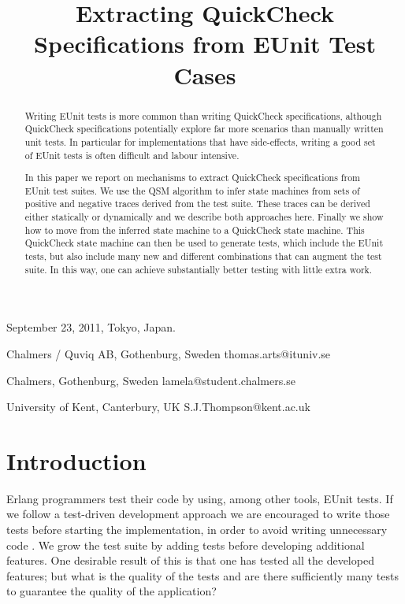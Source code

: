 \documentclass[]{sigplanconf}
\begin{document}
 {September 23, 2011, Tokyo, Japan.}

\title{Extracting QuickCheck Specifications from EUnit Test Cases}

                {Chalmers / Quviq AB, Gothenburg, Sweden}
                {thomas.arts@ituniv.se}

                {Chalmers, Gothenburg, Sweden}
                {lamela@student.chalmers.se}

                {University of Kent, Canterbury, UK}
                {S.J.Thompson@kent.ac.uk}



\maketitle

\begin{abstract}
Writing EUnit tests is more common than writing QuickCheck specifications, although QuickCheck specifications potentially explore far more scenarios than manually written unit tests. 
In particular for implementations that have side-effects, writing a good set of EUnit tests is often difficult and labour intensive.

In this paper we report on mechanisms to extract QuickCheck specifications from EUnit test suites. We use the QSM algorithm to infer state machines from sets of positive and negative traces derived from the test suite. These traces can be derived either statically or dynamically and we describe both approaches here. Finally we show how to move from the inferred state machine to a QuickCheck state machine. This QuickCheck state machine can then be used to generate tests, which include the EUnit tests, but also include many new and different combinations that can augment the test suite. In this way, one can achieve substantially better testing with little extra work.
\end{abstract}

\section{Introduction}

Erlang programmers test their code by using, among other tools,
EUnit tests. If we follow a test-driven development approach we are
encouraged to write those tests before starting the implementation,
in order to avoid writing unnecessary code \cite{beck2003test}. We grow
the test suite by adding tests before developing additional features. One desirable result of this is that one has tested all the developed features; but what is the quality of the 
tests and are there sufficiently many tests to guarantee the quality of the application?
\end{document}
